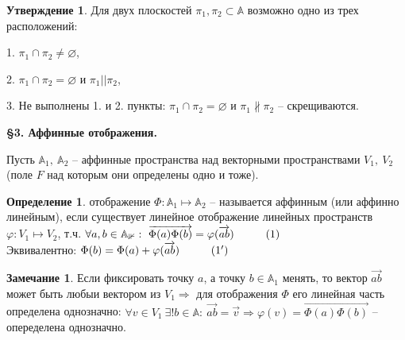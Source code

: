 \documentclass[a4paper, 12pt]{article}
\newcommand\tab[1][.5cm]{\hspace*{#1}}
\theoremstyle{definition}
\newtheorem*{definition}{Определение}
\newtheorem*{subtheorem}{Утверждение}
\newtheorem*{remark}{Замечание}
\begin{document}
    \begin{subtheorem}
        Для двух плоскостей $\pi_1, \pi_2 \subset \mathbb{A} $ 
        возможно
        одно из трех расположений:

        1. $\pi_1 \cap \pi_2 \neq \varnothing$,
        
        2. $\pi_1 \cap \pi_2 = \varnothing$ и $\pi_1 || \pi_2$,

        3. Не выполнены 1. и 2. пункты: $\pi_1 \cap \pi_2 = 
        \varnothing$ и $\pi_1 \nparallel  \pi_2$ -- 
        скрещиваются.
    \end{subtheorem}
    \begin{center}
        \begin{Large}
            \textbf{\S3. Аффинные отображения.}
        \end{Large}
    \end{center}
    Пусть $\mathbb{A}_1,\ \mathbb{A}_2$ -- аффинные 
    пространства над векторными пространствами $V_1,\ V_2$
    (поле $F$  над которым они определены одно и тоже).
    \begin{definition}
        отображение $\Phi:\mathbb{A}_1 \longmapsto \mathbb{A}_2
        $ -- называется аффинным (или аффинно линейным), если
        существует линейное отображение линейных пространств
        $\varphi:V_1 \longmapsto V_2$, т.ч. $\forall a,b \in 
        \mathbb{A_1}:\ \overrightarrow{\Phi(a)\Phi(b)} = 
        \varphi(\overrightarrow{ab}) \tab[1cm](1)$\\
        Эквивалентно: $\Phi(b) = \Phi(a) + \varphi
        (\overrightarrow{ab}) \tab[1cm](1')$
        \begin{remark}
            Если фиксировать точку $a$, а точку $b \in \mathbb
            {A}_1$ менять, то вектор $\overrightarrow{ab}$ 
            может быть любыи вектором из $V_1 \Longrightarrow 
            $ для отображения $\Phi$ его линейная часть 
            определена однозначно: $\forall v \in V_1\ 
            \exists! b \in \mathbb{A}:\ \overrightarrow{ab} = 
            \overrightarrow{v} \Longrightarrow \varphi(v) = 
            \overrightarrow{\Phi(a)\Phi(b)}$ -- опеределена 
            однозначно.
        \end{remark}
    \end{definition}
\end{document}
